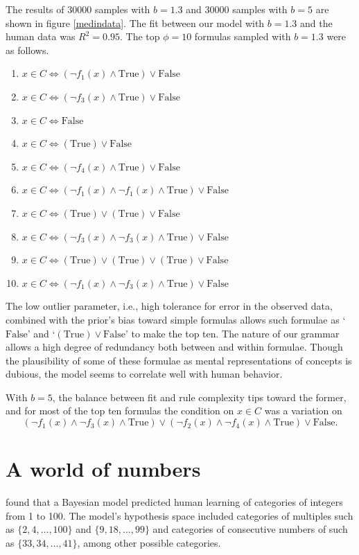 \documentclass[apacite,jou]{apa6}
\newcommand{\True}{\text{True}}
\newcommand{\False}{\text{False}}
\begin{document}
The results 
of 30000 samples with $b=1.3$
and 30000 samples with $b=5$ are shown in figure \ref{medindata}.
The fit between our model with $b=1.3$ and the human data
 was $R^2 = 0.95$.
The top $\phi=10$ formulas sampled with $b=1.3$ were as follows.
\begin{enumerate}
	\item $x\in C\Leftrightarrow 
		(\neg f_1(x)\wedge\True)\vee\False$
	\item $x\in C\Leftrightarrow 
		(\neg f_3(x)\wedge\True)\vee\False$
	\item $x\in C\Leftrightarrow 
		\False$
	\item $x\in C\Leftrightarrow 
		(\True)\vee\False$
	\item $x\in C\Leftrightarrow 
		(\neg f_4(x)\wedge\True)\vee\False$
	\item $x\in C\Leftrightarrow 
		(\neg f_1(x)\wedge\neg f_1(x)\wedge\True)\vee\False$
	\item $x\in C\Leftrightarrow 
		(\True)\vee(\True)\vee\False$
	\item $x\in C\Leftrightarrow 
		(\neg f_3(x)\wedge\neg f_3(x)\wedge\True)\vee\False$
	\item $x\in C\Leftrightarrow 
		(\True)\vee(\True)\vee(\True)\vee\False$
	\item $x\in C\Leftrightarrow 
		(\neg f_1(x)\wedge\neg f_3(x)\wedge\True)\vee\False$
\end{enumerate}
The low outlier parameter, i.e., high tolerance for error in the
observed data, combined with the prior's bias toward simple
formulas allows such formulae as `$\False$' and `$(\True)\vee\False$'
to make the top ten.
The nature of our grammar allows a high degree of redundancy 
both between and within formulae. Though the plausibility
of some of these formulae as mental representations of concepts
is dubious, the model seems to correlate well with human behavior.

With $b=5$, the balance between fit and rule complexity tips toward
the former, and for most of the top ten formulas 
the condition on $x\in C$ was a variation on
\[ (\neg f_1(x)\wedge\neg f_3(x)\wedge\True) \vee
	(\neg f_2(x)\wedge\neg f_4(x)\wedge\True) \vee\False. \]


\section{A world of numbers}

\citet{numbergame} found that a Bayesian model predicted human
learning of categories of integers from 1 to 100. The model's
hypothesis space included categories of multiples such as
$\{2,4,\ldots,100\}$ and $\{9, 18,\ldots,99\}$ and categories of 
consecutive numbers of such as $\{33,34,\ldots,41\}$, among other
possible categories.
\end{document}
